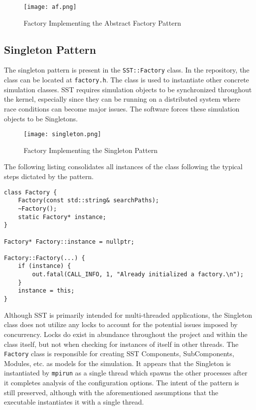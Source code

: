 \begin{figure}[h]
    \caption{Factory Implementing the Abstract Factory Pattern}
    \centering
    \texttt{[image: af.png]}
\end{figure}


\subsection{Singleton Pattern}
The singleton pattern is present in the \texttt{SST::Factory} class. In the repository, the class can be located at \texttt{factory.h}. The class is used to instantiate other concrete simulation classes. SST requires simulation objects to be synchronized throughout the kernel, especially since they can be running on a distributed system where race conditions can become major issues. The software forces these simulation objects to be Singletons.

\begin{figure}[h]
    \caption{Factory Implementing the Singleton Pattern}
    \centering
    \texttt{[image: singleton.png]}
\end{figure}
\newpage

The following listing consolidates all instances of the class following the typical steps dictated by the pattern.

\begin{lstlisting}[style=customC++,label=singleton,caption=Factory Implementing the Singleton Pattern \\ File: src/sst/core/factory.h and src/sst/core/factory.cc]
class Factory {
    Factory(const std::string& searchPaths);
    ~Factory();
    static Factory* instance;
}

Factory* Factory::instance = nullptr;

Factory::Factory(...) {
    if (instance) {
        out.fatal(CALL_INFO, 1, "Already initialized a factory.\n");
    }
    instance = this;
}
\end{lstlisting}

Although SST is primarily intended for multi-threaded applications, the Singleton class does not utilize any locks to account for the potential issues imposed by concurrency. Locks do exist in abundance throughout the project and within the class itself, but not when checking for instances of itself in other threads. The \texttt{Factory} class is responsible for creating SST Components, SubComponents, Modules, etc. as models for the simulation. It appears that the Singleton is instantiated by \texttt{mpirun} as a single thread which spawns the other processes after it completes analysis of the configuration options. The intent of the pattern is still preserved, although with the aforementioned assumptions that the executable instantiates it with a single thread.


